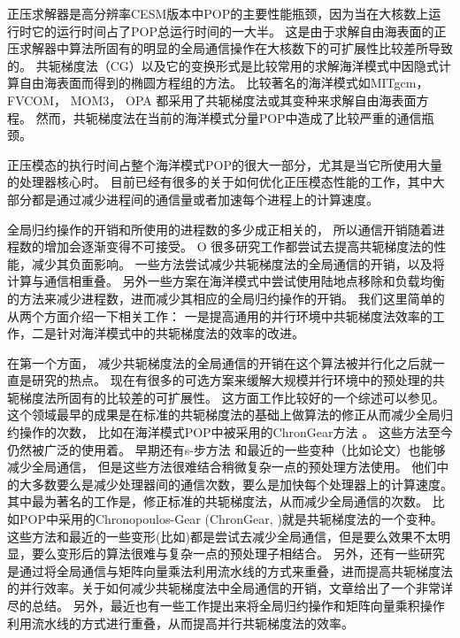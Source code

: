 正压求解器是高分辨率CESM版本中POP的主要性能瓶颈，因为当在大核数上运行时它的运行时间占了POP总运行时间的一大半。 
这是由于求解自由海表面的正压求解器中算法所固有的明显的全局通信操作在大核数下的可扩展性比较差所导致的。
共轭梯度法（CG）以及它的变换形式是比较常用的求解海洋模式中因隐式计算自由海表面而得到的椭圆方程组的方法。
比较著名的海洋模式如MITgcm\citep{adcroft2014mitgcm}， FVCOM\citep{lai2010nonhydrostatic}， MOM3\citep{pacanowsky1999mom3}， OPA \citep{madec1997ocean}
都采用了共轭梯度法或其变种来求解自由海表面方程。
然而，共轭梯度法在当前的海洋模式分量POP中造成了比较严重的通信瓶颈\citep{Worley:2011:PCE:2063384.2063457}。 

正压模态的执行时间占整个海洋模式POP的很大一部分，尤其是当它所使用大量的处理器核心时。
目前已经有很多的关于如何优化正压模态性能的工作，其中大部分都是通过减少进程间的通信量或者加速每个进程上的计算速度。 

全局归约操作的开销和所使用的进程数的多少成正相关的， 所以通信开销随着进程数的增加会逐渐变得不可接受。
O
很多研究工作都尝试去提高共轭梯度法的性能，减少其负面影响。 
一些方法尝试减少共轭梯度法的全局通信的开销\cite{dAzevedo1999lapack}，以及将计算与通信相重叠\cite{beare1997optimisation}。 
另外一些方案在海洋模式中尝试使用陆地点移除和负载均衡\cite{dennis2007inverse, dennis2008scaling} 的方法来减少进程数，进而减少其相应的全局归约操作的开销。 
我们这里简单的从两个方面介绍一下相关工作： 一是提高通用的并行环境中共轭梯度法效率的工作，二是针对海洋模式中的共轭梯度法的效率的改进。

在第一个方面， 减少共轭梯度法的全局通信的开销在这个算法被并行化之后就一直是研究的热点。 
现在有很多的可选方案来缓解大规模并行环境中的预处理的共轭梯度法所固有的比较差的可扩展性。
这方面工作比较好的一个综述可以参见\cite{ghysels2014}。 
这个领域最早的成果是在标准的共轭梯度法的基础上做算法的修正从而减少全局归约操作的次数， 比如在海洋模式POP中被采用的ChronGear方法\cite{dAzevedo1999lapack} 。 这些方法至今仍然被广泛的使用着。 
早期还有s-步方法\cite{chron1989} 和最近的一些变种（比如论文）也能够减少全局通信， 但是这些方法很难结合稍微复杂一点的预处理方法使用。
他们中的大多数要么是减少处理器间的通信次数，要么是加快每个处理器上的计算速度。
其中最为著名的工作是，修正标准的共轭梯度法，从而减少全局通信的次数。 比如POP中采用的Chronopoulos-Gear (ChronGear, \cite{dAzevedo1999lapack})就是共轭梯度法的一个变种。
这些方法和最近的一些变形(比如\cite{hoemmen2010})都是尝试去减少全局通信，但是要么效果不太明显，要么变形后的算法很难与复杂一点的预处理子相结合\citep{ghysels2014}。
另外，还有一些研究是通过将全局通信与矩阵向量乘法利用流水线的方式来重叠，进而提高共轭梯度法的并行效率。关于如何减少共轭梯度法中全局通信的开销，文章\cite{ghysels2014}给出了一个非常详尽的总结。
另外，最近也有一些工作提出来将全局归约操作和矩阵向量乘积操作利用流水线的方式进行重叠\cite{ghysels2014}，从而提高并行共轭梯度法的效率。  



